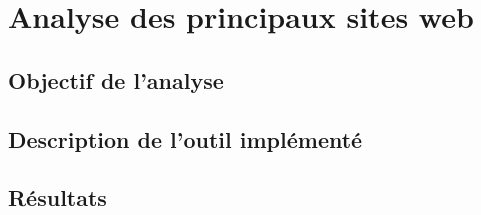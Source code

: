 \chapter{Analyse des principaux sites web}
\section{Objectif de l'analyse}
\section{Description de l'outil implémenté}
\section{Résultats}